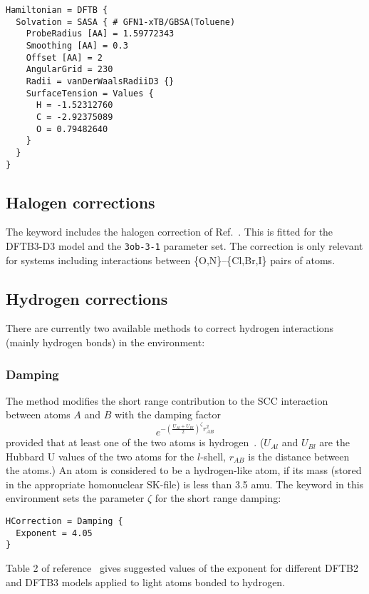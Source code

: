 \begin{verbatim}
Hamiltonian = DFTB {
  Solvation = SASA { # GFN1-xTB/GBSA(Toluene)
    ProbeRadius [AA] = 1.59772343
    Smoothing [AA] = 0.3
    Offset [AA] = 2
    AngularGrid = 230
    Radii = vanDerWaalsRadiiD3 {}
    SurfaceTension = Values {
      H = -1.52312760
      C = -2.92375089
      O = 0.79482640
    }
  }
}
\end{verbatim}


\subsection{Halogen corrections}
\label{sec:dftbp.xcorr}

The  keyword includes the halogen correction of
Ref.~\cite{kubillus-jctc-11-332}. This is fitted for the DFTB3-D3 model and the
{\tt 3ob-3-1} parameter set. The correction is only relevant for systems
including interactions between \{O,N\}--\{Cl,Br,I\} pairs of atoms.


\subsection{Hydrogen corrections}
\label{sec:dftbp.hcorr}

There are currently two available methods to correct hydrogen interactions
(mainly hydrogen bonds) in the  environment:

\subsubsection{Damping}

The  method modifies the short range contribution to the SCC
interaction between atoms $A$ and $B$ with the damping factor
\begin{equation*}
  e^{-\left(\frac{U_{Al} + U_{Bl}}{2}\right)^\zeta r_{AB}^2}
\end{equation*}
provided that at least one of the two atoms is
hydrogen~\cite{gauss-jctc-7-931,yang-JPCA-111-10861}. ($U_{Al}$ and $U_{Bl}$ are
the Hubbard U values of the two atoms for the $l$-shell, $r_{AB}$ is the
distance between the atoms.) An atom is considered to be a hydrogen-like atom,
if its mass (stored in the appropriate homonuclear SK-file) is less than 3.5
amu.  The  keyword in this environment sets the parameter $\zeta$
for the short range damping:
\begin{verbatim}
HCorrection = Damping {
  Exponent = 4.05
}
\end{verbatim}
Table 2 of reference~\cite{gauss-jctc-7-931} gives suggested values of the
exponent for different DFTB2 and DFTB3 models applied to light atoms bonded to
hydrogen.

